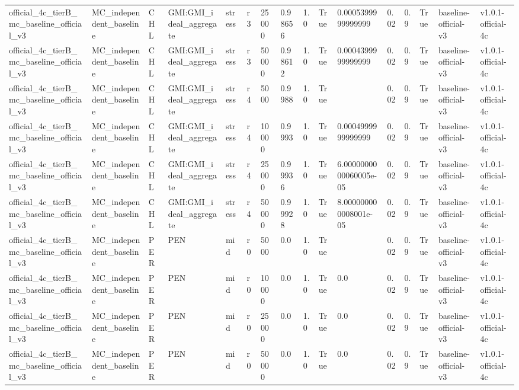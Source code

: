 \begin{table}[!htbp]
\begin{tabular}{llllllllllllllll}
official\_4c\_tierB\_mc\_baseline\_official\_v3 & MC\_independent\_baseline & CHL & GMI:GMI\_ideal\_aggregate & stress & r3 & 25000 & 0.98656 & 1.0 & True & 0.0005399999999999 & 0.02 & 0.9 & True & baseline-official-v3 & v1.0.1-official-4c \\
official\_4c\_tierB\_mc\_baseline\_official\_v3 & MC\_independent\_baseline & CHL & GMI:GMI\_ideal\_aggregate & stress & r3 & 50000 & 0.98612 & 1.0 & True & 0.0004399999999999 & 0.02 & 0.9 & True & baseline-official-v3 & v1.0.1-official-4c \\
official\_4c\_tierB\_mc\_baseline\_official\_v3 & MC\_independent\_baseline & CHL & GMI:GMI\_ideal\_aggregate & stress & r4 & 5000 & 0.9988 & 1.0 & True &  & 0.02 & 0.9 & True & baseline-official-v3 & v1.0.1-official-4c \\
official\_4c\_tierB\_mc\_baseline\_official\_v3 & MC\_independent\_baseline & CHL & GMI:GMI\_ideal\_aggregate & stress & r4 & 10000 & 0.9993 & 1.0 & True & 0.0004999999999999 & 0.02 & 0.9 & True & baseline-official-v3 & v1.0.1-official-4c \\
official\_4c\_tierB\_mc\_baseline\_official\_v3 & MC\_independent\_baseline & CHL & GMI:GMI\_ideal\_aggregate & stress & r4 & 25000 & 0.99936 & 1.0 & True & 6.0000000000060005e-05 & 0.02 & 0.9 & True & baseline-official-v3 & v1.0.1-official-4c \\
official\_4c\_tierB\_mc\_baseline\_official\_v3 & MC\_independent\_baseline & CHL & GMI:GMI\_ideal\_aggregate & stress & r4 & 50000 & 0.99928 & 1.0 & True & 8.000000000008001e-05 & 0.02 & 0.9 & True & baseline-official-v3 & v1.0.1-official-4c \\
official\_4c\_tierB\_mc\_baseline\_official\_v3 & MC\_independent\_baseline & PER & PEN & mid & r0 & 5000 & 0.0 & 1.0 & True &  & 0.02 & 0.9 & True & baseline-official-v3 & v1.0.1-official-4c \\
official\_4c\_tierB\_mc\_baseline\_official\_v3 & MC\_independent\_baseline & PER & PEN & mid & r0 & 10000 & 0.0 & 1.0 & True & 0.0 & 0.02 & 0.9 & True & baseline-official-v3 & v1.0.1-official-4c \\
official\_4c\_tierB\_mc\_baseline\_official\_v3 & MC\_independent\_baseline & PER & PEN & mid & r0 & 25000 & 0.0 & 1.0 & True & 0.0 & 0.02 & 0.9 & True & baseline-official-v3 & v1.0.1-official-4c \\
official\_4c\_tierB\_mc\_baseline\_official\_v3 & MC\_independent\_baseline & PER & PEN & mid & r0 & 50000 & 0.0 & 1.0 & True & 0.0 & 0.02 & 0.9 & True & baseline-official-v3 & v1.0.1-official-4c \\

\end{tabular}
\end{table}
